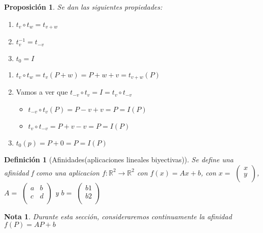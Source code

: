 \documentclass[11pt, a4paper, titlepage]{article}
\makeatletter
\renewenvironment{proof}[1][\proofname] {\vspace{-15pt}\par\pushQED{\qed}\normalfont\topsep6\p@\@plus6\p@\relax\trivlist\item[\hskip\labelsep\it#1\@addpunct{.}]\ignorespaces}{\popQED\endtrivlist\@endpefalse}
\newcommand{\R}{\mathbb{R}}
\theoremstyle{theorem-style}
\newtheorem*{nprop}{Proposición}
\theoremstyle{definition-style}
\newtheorem*{ndef}{Definición}
\theoremstyle{remark-style}
\newtheorem*{nota}{Nota}
\theoremstyle{example-style}
\newenvironment{nlist}
{\begin{enumerate}
\renewcommand\labelenumi{(\emph{\roman{enumi})}}}
{\end{enumerate}}
\makeatother
\begin{document}
\begin{nprop}
	Se dan las siguientes propiedades:
\begin{nlist}
	\item $t_v \circ t_w = t_{v+w}$
	\item $t_{v}^{-1} = t_{-v}$
	\item $t_0 = I$
\end{nlist}
\end{nprop}
\begin{proof}\hfill \begin{center}\end{center}
	\begin{nlist}
	\item $t_v \circ t_w = t_v(P+w) = P+w+v = t_{v+w}(P)$
	\item Vamos a ver que $t_{-v}\circ t_v = I = t_v \circ t_{-v}$
	\begin{itemize}
	\item $t_{-v}\circ t_v (P) = P-v+v = P = I(P)$
	\item $t_v\circ t_{-v} = P+v-v = P = I(P)$
\end{itemize}
	\item $t_0(p) = P +0 = P = I(P)$
\end{nlist}
\end{proof}

\begin{ndef}[Afinidades(aplicaciones lineales biyectivas)]
	Se define una afinidad f como una aplicacion $f:\R^2 \rightarrow \R^2$ con $f(x) = Ax + b$, con $x =$ $\begin{pmatrix}
	x\\
	y\\
\end{pmatrix}$, $A =$ $\begin{pmatrix}
	a & b\\
	c & d\\
\end{pmatrix}$
y $b =$ $\begin{pmatrix}
	b1\\
	b2\\
\end{pmatrix}$


\end{ndef}


\begin{nota}
	Durante esta sección, consideraremos continuamente la afinidad $f(P) = AP + b $
\end{nota}
\end{document}
